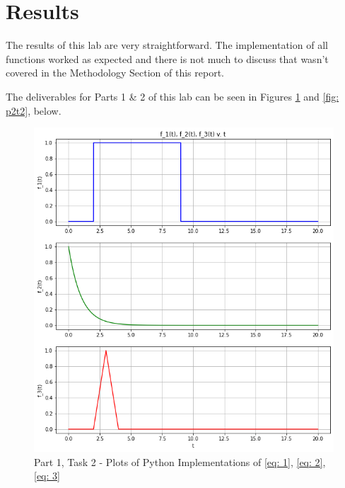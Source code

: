\documentclass[12pt]{report}
\begin{document}
\section{Results}
The results of this lab are very straightforward. The implementation of all functions worked as expected and there is not much to discuss that wasn't covered in the Methodology 
Section of this report. 

The deliverables for Parts 1 \& 2 of this lab can be seen in Figures \ref{fig: p1t2} and \ref{fig: p2t2}, below.
\\
\begin{figure}[h!]
  \centering
  \includegraphics[scale=0.5]{p1t2.png}
  \caption{Part 1, Task 2 - Plots of Python Implementations of \eqref{eq: 1}, \eqref{eq: 2}, \eqref{eq: 3}}
  \label{fig: p1t2}
\end{figure}
\end{document}
